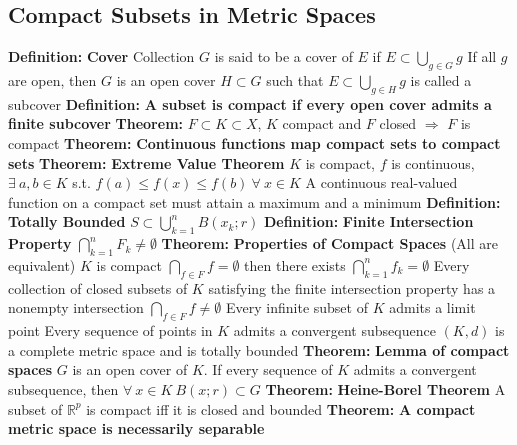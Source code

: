 \documentclass[14pt]{extarticle}
\def\Definition{{\color{Blue} \textbf{Definition:} }}
\def\Theorem{{\color{Red} \textbf{Theorem:} }}
\begin{document}
\begin{outline}
		\section{Compact Subsets in Metric Spaces}
		\1	\Definition \textbf{Cover}
			\2	Collection $G$ is said to be a cover of $E$ if $E \subset \bigcup_{g \in G} g$
			\2	If all $g$ are open, then $G$ is an open cover
			\2	$H \subset G$ such that $E \subset \bigcup_{g \in H} g$ is called a subcover
		\1	\Definition \textbf{A subset is compact if every open cover admits a finite subcover}
		\1	\Theorem	$F \subset K \subset X$, $K$ compact and $F$ closed $\Rightarrow$ $F$ is compact
		\1	\Theorem \textbf{Continuous functions map compact sets to compact sets}	
		\1	\Theorem	\textbf{Extreme Value Theorem}
			\2	$K$ is compact, $f$ is continuous, $\exists~a,b \in K$ s.t. 
					$f(a) \le f(x) \le f(b)~\forall~x \in K$
			\2	A continuous real-valued function on a compact set must attain a maximum
					and a minimum	
		\1	\Definition \textbf{Totally Bounded}
			\2	$S \subset \bigcup_{k=1}^n B(x_k;r)$
		\1	\Definition \textbf{Finite Intersection Property}
			\2	$\bigcap_{k=1}^n F_k \ne \emptyset$
		\1	\Theorem \textbf{Properties of Compact Spaces} (All are equivalent)
			\2	$K$ is compact
			\2	$\bigcap_{f \in F} f = \emptyset$ then there exists $\bigcap_{k=1}^n f_k = \emptyset$
			\2	Every collection of closed subsets of $K$ satisfying the finite 
					intersection property has a nonempty intersection $\bigcap_{f \in F} f \ne \emptyset$
			\2	Every infinite subset of $K$ admits a limit point
			\2	Every sequence of points in $K$ admits a convergent subsequence
			\2	$(K,d)$ is a complete metric space and is totally bounded
		\1	\Theorem \textbf{Lemma of compact spaces}
			\2	$G$ is an open cover of $K$.  If every sequence of $K$ admits a 
					convergent subsequence, then $\forall~x\in K~B(x;r) \subset G$
		\1	\Theorem	\textbf{Heine-Borel Theorem}
			\2	A subset of $\mathbb{R}^p$ is compact iff it is closed and bounded
		\1	\Theorem	\textbf{A compact metric space is necessarily separable}

\end{outline}
\end{document}
